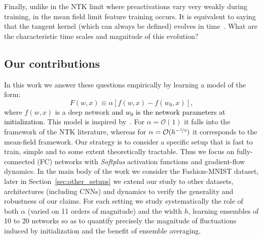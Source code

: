 \documentclass{article}
\newcommand{\st}[1]{\textcolor{black}{#1}}
\renewcommand{\cite}[1]{\citep{#1}}
\newcommand{\mc}{\mathcal}
\newcommand{\sref}[1]{Section~\ref{#1}}
\begin{document}
Finally, unlike in the NTK limit where preactivations vary very weakly during training, in the mean field limit feature training occurs. It is equivalent to saying that the tangent kernel (which can always be defined) evolves in time~\cite{rotskoff2018neural,mei2019mean,chizat19}. What are the characteristic time scales and magnitude of this evolution? 


\subsection{Our contributions}
In this work we answer these questions empirically by learning a model of the form:
\begin{equation}
F(w,x) \equiv \alpha\left[f(w,x) - f(w_0,x)\right],
\label{eq:bachmodel}
\end{equation}
where $f(w,x)$ is a deep network \st{and $w_0$ is the network parameters at initialization}. This model is inspired by~\cite{chizat19}. For $\alpha=\mc O(1)$ it falls into the framework of the NTK literature, whereas for $\alpha=\mc O(h^{-\nicefrac12})$ it corresponds to the mean-field framework.
Our strategy is to consider a specific setup that is fast to train, simple and to some extent theoretically tractable. Thus we focus on %
fully-connected (FC) networks with \textit{Softplus} activation functions and gradient-flow dynamics. In the main body of the work we consider the Fashion-MNIST dataset, later in \sref{sec:other_setups} we extend our study to other datasets, architectures (including CNNs) and dynamics to verify the generality and robustness of our claims. For each setting we study systematically the role of both $\alpha$ (varied on 11 orders of magnitude) and the width $h$, learning ensembles of 10 to 20 networks so as to quantify precisely the magnitude of fluctuations induced by initialization and the benefit of ensemble averaging. 
\end{document}
